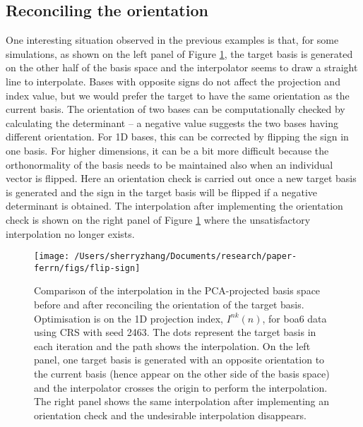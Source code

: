 \hypertarget{reconciling-the-orientation}{%
\subsection{Reconciling the
orientation}\label{reconciling-the-orientation}}

One interesting situation observed in the previous examples is that, for
some simulations, as shown on the left panel of Figure
\ref{fig:flip-sign}, the target basis is generated on the other half of
the basis space and the interpolator seems to draw a straight line to
interpolate. Bases with opposite signs do not affect the projection and
index value, but we would prefer the target to have the same orientation
as the current basis. The orientation of two bases can be
computationally checked by calculating the determinant -- a negative
value suggests the two bases having different orientation. For 1D bases,
this can be corrected by flipping the sign in one basis. For higher
dimensions, it can be a bit more difficult because the orthonormality of
the basis needs to be maintained also when an individual vector is
flipped. Here an orientation check is carried out once a new target
basis is generated and the sign in the target basis will be flipped if a
negative determinant is obtained. The interpolation after implementing
the orientation check is shown on the right panel of Figure
\ref{fig:flip-sign} where the unsatisfactory interpolation no longer
exists.

\begin{Schunk}
\begin{figure}

{\centering \texttt{[image: /Users/sherryzhang/Documents/research/paper-ferrn/figs/flip-sign]} 

}

\caption[Comparison of the interpolation in the PCA-projected basis space before and after reconciling the orientation of the target basis]{Comparison of the interpolation in the PCA-projected basis space before and after reconciling the orientation of the target basis. Optimisation is on the 1D projection index, $I^{nk}(n)$, for boa6 data using CRS with seed 2463. The dots represent the target basis in each iteration and the path shows the interpolation. On the left panel, one target basis is generated with an opposite orientation to the current basis (hence appear on the other side of the basis space) and the interpolator crosses the origin to perform the interpolation. The right panel shows the same interpolation after implementing an orientation check and the undesirable interpolation disappears.}\label{fig:flip-sign}
\end{figure}
\end{Schunk}

